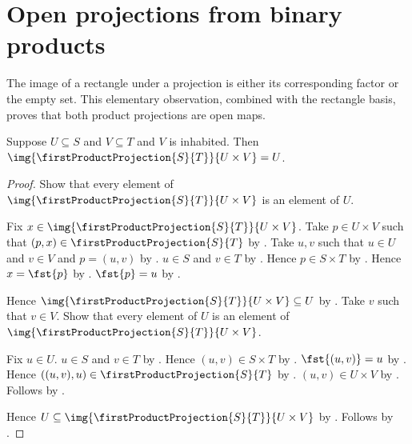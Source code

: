 \section{Open projections from binary products}




The image of a rectangle under a projection is either its corresponding
factor or the empty set.  This elementary observation, combined with the
rectangle basis, proves that both product projections are open maps.

\begin{proposition}\label{first_projection_image_rectangle}
    Suppose $U\subseteq S$ and $V\subseteq T$ and $V$ is inhabited.
    Then
        $\img{\firstProductProjection{S}{T}}{U\times V}=U$.
\end{proposition}
\begin{proof}
    Show that every element of
        $\img{\firstProductProjection{S}{T}}{U\times V}$ is an element
        of $U$.
    \begin{subproof}
        Fix $x\in\img{\firstProductProjection{S}{T}}{U\times V}$.
        Take $p\in U\times V$ such that
            $(p,x)\in\firstProductProjection{S}{T}$ by .
        Take $u,v$ such that $u\in U$ and $v\in V$ and $p=(u,v)$ by
            .
        $u\in S$ and $v\in T$ by .
        Hence $p\in S\times T$ by .
        Hence $x=\fst{p}$ by .
        $\fst{p}=u$ by .
    \end{subproof}
    Hence $\img{\firstProductProjection{S}{T}}{U\times V}
        \subseteq U$ by .
    Take $v$ such that $v\in V$.
    Show that every element of $U$ is an element of
        $\img{\firstProductProjection{S}{T}}{U\times V}$.
    \begin{subproof}
        Fix $u\in U$.
        $u\in S$ and $v\in T$ by .
        Hence $(u,v)\in S\times T$ by .
        $\fst{(u,v)}=u$ by .
        Hence $((u,v),u)\in\firstProductProjection{S}{T}$ by
            .
        $(u,v)\in U\times V$ by .
        Follows by .
    \end{subproof}
    Hence $U\subseteq
        \img{\firstProductProjection{S}{T}}{U\times V}$ by
        .
    Follows by .
\end{proof}

